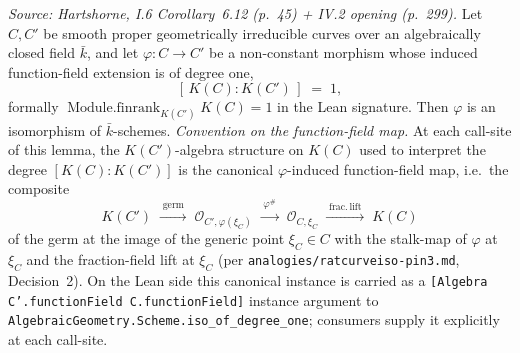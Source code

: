 \begin{lemma}
  \label{lem:degree_one_morphism_iso}
  
  \textit{Source: Hartshorne, I.6 Corollary~6.12 (p.~45) + IV.2 opening
  (p.~299).}
  Let \(C, C'\) be smooth proper geometrically irreducible curves over an
  algebraically closed field \(\bar k\), and let \(\varphi \colon C \to C'\) be
  a non-constant morphism whose induced function-field extension is of
  degree one,
  \[
    [\,K(C) : K(C')\,] \;=\; 1,
  \]
  formally
  \(\operatorname{Module.finrank}_{K(C')} K(C) = 1\) in the Lean signature.
  Then \(\varphi\) is an isomorphism of \(\bar k\)-schemes.
  \emph{Convention on the function-field map.} At each call-site of this
  lemma, the \(K(C')\)-algebra structure on \(K(C)\) used to interpret the
  degree \([K(C) : K(C')]\) is the canonical \(\varphi\)-induced
  function-field map, i.e.\ the composite
  \[
    K(C') \;\xrightarrow{\;\text{germ}\;}\;
    \mathcal O_{C', \varphi(\xi_C)}
    \;\xrightarrow{\;\varphi^\#\;}\;
    \mathcal O_{C, \xi_C}
    \;\xrightarrow{\;\text{frac.}\,\text{lift}\;}\; K(C)
  \]
  of the germ at the image of the generic point \(\xi_C \in C\) with the
  stalk-map of \(\varphi\) at \(\xi_C\) and the fraction-field lift at
  \(\xi_C\) (per \texttt{analogies/ratcurveiso-pin3.md}, Decision~2). On
  the Lean side this canonical instance is carried as a
  \texttt{[Algebra C'.functionField C.functionField]} instance argument
  to \texttt{AlgebraicGeometry.Scheme.iso\_of\_degree\_one}; consumers
  supply it explicitly at each call-site.
\end{lemma}
